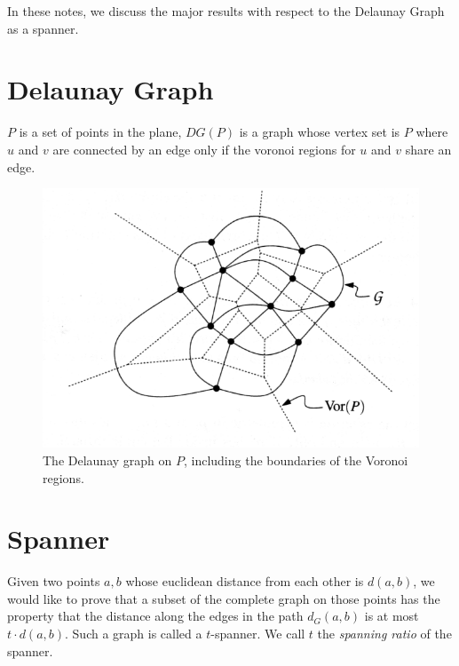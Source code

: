 \documentclass{tufte-handout}
\title{\DocTitle}
\author{\DocAuthor}
\begin{document}
\maketitle
\vspace{1cm}

In these notes, we discuss the major results with respect to the
Delaunay Graph as a spanner.

\part{Delaunay Graph}

$P$ is a set of points in the plane, $DG(P)$ is a graph whose vertex
set is $P$ where $u$ and $v$ are connected by an edge only if the
voronoi regions for $u$ and $v$ share an edge.

\begin{figure}
  \includegraphics[scale=1.6]{figures/delaunay_graph.png}
  \caption{The Delaunay graph on $P$, including the boundaries of the
    Voronoi regions.}
\end{figure}

\part{Spanner}

Given two points $a,b$ whose euclidean distance from each other is
$d(a,b)$, we would like to prove that a subset of the complete graph
on those points has the property that the distance along the edges in
the path $d_G(a,b)$ is at most $t \cdot d(a,b)$.  Such a graph is
called a $t$-spanner.  We call $t$ the \emph{spanning ratio} of the
spanner.
\end{document}
